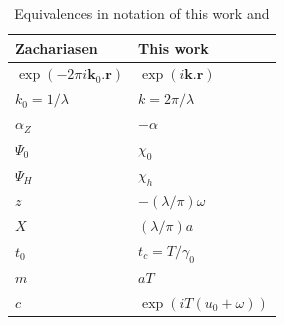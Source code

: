 \documentclass[preprint]{iucr}              %
\newcommand{\inred}[1]{{\color{red}#1}}
\begin{document}
\begin{table}
\caption{Equivalences in notation of this work and \cite{ZachariasenBook}}
    \begin{center}
\begin{tabular}{ll}      %
 Zachariasen    & This work     \\
\hline
$\exp(-2\pi i \textbf{k}_0.\textbf{r})$ & $\exp(i\textbf{k}.\textbf{r})$      \\
 $k_0=1/\lambda$ & $k=2 \pi / \lambda$      \\
 $\alpha_Z$      & $-\alpha$                \\
 $\Psi_0$      & $\chi_0$                 \\
 $\Psi_H$      & $\chi_h$                 \\
 $z$           & $-(\lambda/\pi) \omega$  \\
 $X$           & $(\lambda/\pi) a$        \\
 $t_0$         & $t_c=T/\gamma_0$         \\
 \inred{$m$}           & $a T$                    \\
 $c$  & $\exp(i T (u_0+\omega))$   
 \end{tabular}
     \end{center}
\end{table}












\end{document}
